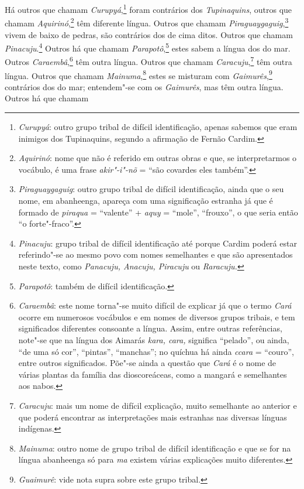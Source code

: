 \begin{linenumbers}
 Há outros que chamam \textit{Curupyá},\footnote{ \textit{Curupyá}: 
outro grupo tribal de difícil identificação, apenas sabemos que eram
inimigos dos Tupinaquins, segundo a afirmação de Fernão Cardim.}
foram contrários dos \textit{Tupinaquins}, outros que chamam
\textit{Aquirinó},\footnote{ \textit{Aquirinó}: nome que não é
referido em outras obras e que, se interpretarmos o vocábulo, é uma frase
\textit{akir"-i"-nõ} = ``são covardes eles também''.} têm
diferente língua. Outros que chamam \textit{Piraguaygaguig},\footnote{ \textit{Piraguaygaguig}: outro grupo tribal de difícil identificação,
ainda que o seu nome, em abanheenga, apareça com uma significação
estranha já que é formado de \textit{piraqua} = ``valente'' +
\textit{aquy} = ``mole'', ``frouxo'', o que seria então ``o
forte"-fraco''.} vivem de baixo de pedras, são contrários dos de
cima ditos. Outros que chamam \textit{Pinacuju}.\footnote{ \textit{Pinacuju}: grupo tribal de difícil identificação até porque
Cardim poderá estar referindo"-se ao mesmo povo com nomes semelhantes e
que são apresentados neste texto, como \textit{Panacuju, Anacuju, 
Piracuju} ou \textit{Raracuju.}} Outros há que chamam
\textit{Parapotô},\footnote{ \textit{Parapotô}: também de difícil
identificação.} estes sabem a língua dos do mar. Outros
\textit{Caraembâ},\footnote{ \textit{Caraembâ}: este nome torna"-se
muito difícil de explicar já que o termo \textit{Cará} ocorre em
numerosos vocábulos e em nomes de diversos grupos tribais, e tem
significados diferentes consoante a língua. Assim, entre outras
referências, note"-se que na língua dos Aimarás \textit{kara, cara,} 
significa ``pelado'', ou ainda, ``de uma só cor'', ``pintas'', ``manchas''; no
quíchua há ainda \textit{ccara} = ``couro'', entre outros significados.
Põe"-se ainda a questão que \textit{Cará} é o nome de várias plantas da
família das dioscoreáceas, como a mangará e semelhantes aos nabos. }
têm outra língua. Outros que chamam 
\textit{Caracuju},\footnote{ \textit{Caracuju}: mais um nome de difícil explicação,
muito semelhante ao anterior e que poderá encontrar as interpretações
mais estranhas nas diversas línguas indígenas.} têm outra
língua. Outros que chamam \textit{Mainuma},\footnote{ \textit{Mainuma}: 
outro nome de grupo tribal de difícil identificação e que se for na
língua abanheenga só para \textit{ma} existem várias explicações muito
diferentes.} estes se misturam com \textit{Gaimurês},\footnote{ \textit{Guaimurê}: 
vide nota supra sobre este grupo tribal.} contrários dos do mar; entendem"-se 
com os \textit{Gaimurês}, mas têm outra língua. Outros há que chamam 

\end{linenumbers}

